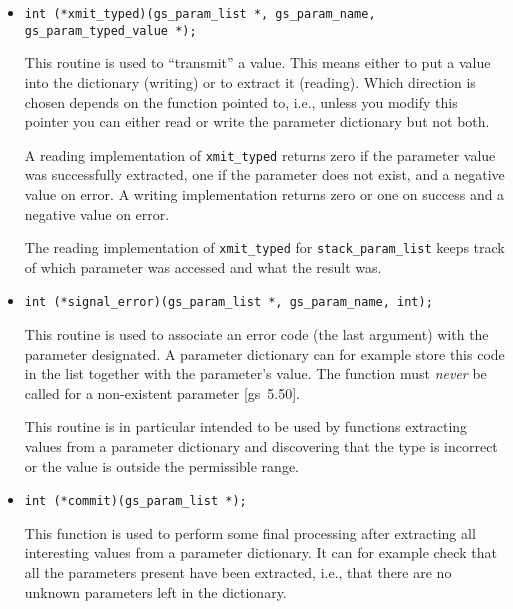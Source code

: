 \documentclass[twoside,a4paper]{article}
\newcommand{\prog}[1]{\texttt{#1}}
\newif\ifdraft \draftfalse
\begin{document}
\begin{itemize}
  \item \prog{int (*xmit\_typed)(gs\_param\_list *, gs\_param\_name,
      gs\_param\_typed\_value *);}

    This routine is used to ``transmit'' a value.
    This means either to put a value into the dictionary (writing)
    or to extract it (reading).
    Which direction is chosen depends on the function pointed to,
    i.e., unless you modify this pointer you can either read or write the
    parameter dictionary but not both.

    A reading implementation of \prog{xmit\_typed} returns zero if the
    parameter value was successfully extracted,
    one if the parameter does not exist,
    and a negative value on error.
    A writing implementation returns zero or one on success and
    a negative value on error.

    The reading implementation of \prog{xmit\_typed} for
    \prog{stack\_param\_list}	%
    keeps track of which parameter was accessed and what the result was.

    \ifdraft
    ??? Discuss selective writing.
    \fi
  \item \prog{int (*signal\_error)(gs\_param\_list *, gs\_param\_name, int);}

    This routine is used to associate an error code (the last argument) with
    the parameter designated.
    A parameter dictionary can for example store this code in the list together
    with the parameter's value.
    The function must \emph{never\/} be called for a
    non-existent parameter [gs~5.50].

    This routine is in particular intended to be used by functions extracting
    values from a parameter dictionary and discovering that
    the type is incorrect or the value is outside the permissible range.
  \item \prog{int (*commit)(gs\_param\_list *);}

    This function is used to perform some final processing after extracting
    all interesting values from a parameter dictionary.
    It can for example check that all the parameters present have been
    extracted,
    i.e., that there are no unknown parameters left in the dictionary.


\end{itemize}
\end{document}
